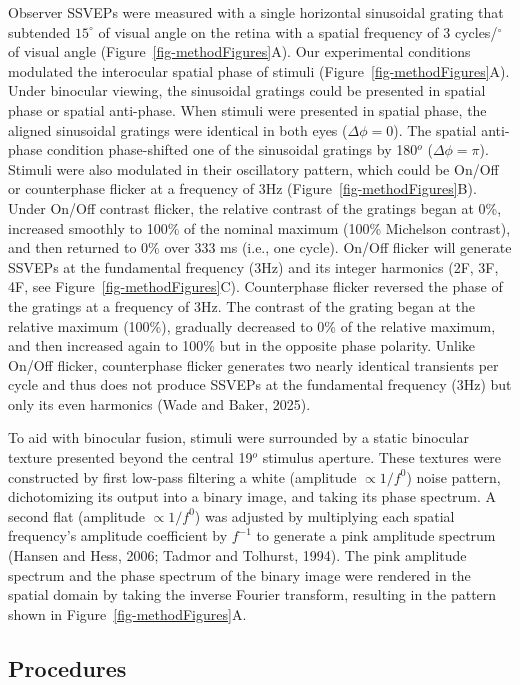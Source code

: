 \documentclass[
  12pt,
]{article}
\begin{document}
Observer SSVEPs were measured with a single horizontal sinusoidal
grating that subtended \(15^\circ\) of visual angle on the retina with a
spatial frequency of 3 cycles/\(^\circ\) of visual angle
(Figure~\ref{fig-methodFigures}A). Our experimental conditions modulated
the interocular spatial phase of stimuli
(Figure~\ref{fig-methodFigures}A). Under binocular viewing, the
sinusoidal gratings could be presented in spatial phase or spatial
anti-phase. When stimuli were presented in spatial phase, the aligned
sinusoidal gratings were identical in both eyes (\(\Delta \phi = 0\)).
The spatial anti-phase condition phase-shifted one of the sinusoidal
gratings by 180\(^o\) (\(\Delta \phi = \pi\)). Stimuli were also
modulated in their oscillatory pattern, which could be On/Off or
counterphase flicker at a frequency of 3Hz
(Figure~\ref{fig-methodFigures}B). Under On/Off contrast flicker, the
relative contrast of the gratings began at 0\%, increased smoothly to
100\% of the nominal maximum (100\% Michelson contrast), and then
returned to 0\% over 333 ms (i.e., one cycle). On/Off flicker will
generate SSVEPs at the fundamental frequency (3Hz) and its integer
harmonics (2F, 3F, 4F, see Figure~\ref{fig-methodFigures}C).
Counterphase flicker reversed the phase of the gratings at a frequency
of 3Hz. The contrast of the grating began at the relative maximum
(100\%), gradually decreased to 0\% of the relative maximum, and then
increased again to 100\% but in the opposite phase polarity. Unlike
On/Off flicker, counterphase flicker generates two nearly identical
transients per cycle and thus does not produce SSVEPs at the fundamental
frequency (3Hz) but only its even harmonics (Wade and Baker, 2025).

To aid with binocular fusion, stimuli were surrounded by a static
binocular texture presented beyond the central 19\(^o\) stimulus
aperture. These textures were constructed by first low-pass filtering a
white (amplitude \(\propto 1/f^0\)) noise pattern, dichotomizing its
output into a binary image, and taking its phase spectrum. A second flat
(amplitude \(\propto 1/f^0\)) was adjusted by multiplying each spatial
frequency's amplitude coefficient by \(f^{-1}\) to generate a pink
amplitude spectrum (Hansen and Hess, 2006; Tadmor and Tolhurst, 1994).
The pink amplitude spectrum and the phase spectrum of the binary image
were rendered in the spatial domain by taking the inverse Fourier
transform, resulting in the pattern shown in
Figure~\ref{fig-methodFigures}A.

\subsection{Procedures}\label{procedures}
\end{document}
